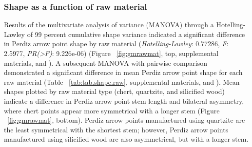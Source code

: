 \documentclass[review]{elsarticle}
\begin{document}
\subsubsection*{Shape as a function of raw material}

Results of the multivariate analysis of variance (MANOVA) through a Hotelling-Lawley of 99 percent cumulative shape variance indicated a significant difference in Perdiz arrow point shape by raw material (\textit{Hotelling-Lawley}: 0.77286, \textit{F}: 2.5977, \textit{PR(>F)}: 9.226e-06) (Figure ~\ref{fig:gmrawmat}, top,  supplemental materials, and \citealp[Chapter 4]{RN8980}). A subsequent MANOVA with pairwise comparison demonstrated a significant difference in mean Perdiz arrow point shape for each raw material (Table ~\ref{tab:tab.shape.raw}, supplemental materials, and \citealp[Chapter 4]{RN8980}). Mean shapes plotted by raw material type (chert, quartzite, and silicified wood) indicate a difference in Perdiz arrow point stem length and bilateral asymmetry, where chert points appear more symmetrical with a longer stem (Figure ~\ref{fig:gmrawmat}, bottom). Perdiz arrow points manufactured using quartzite are the least symmetrical with the shortest stem; however, Perdiz arrow points manufactured using silicified wood are also asymmetrical, but with a longer stem.
\end{document}
